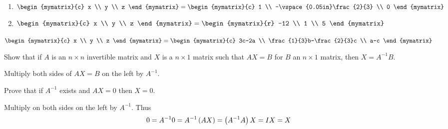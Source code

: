 \begin{enumialphparenastyle}
\begin{ex}
\begin{sol}
\begin{enumerate}
\item $\begin{mymatrix}{c}
x \\
y \\
z
\end{mymatrix} =\begin{mymatrix}{c}
1 \\
-\vspace{0.05in}\frac{2}{3} \\
0
\end{mymatrix}$
\item $\begin{mymatrix}{c}
x \\
y \\
z
\end{mymatrix} = \begin{mymatrix}{r}
-12 \\
1 \\
5
\end{mymatrix}$
\end{enumerate}

$\begin{mymatrix}{c}
x \\
y \\
z
\end{mymatrix} = 
\begin{mymatrix}{c}
3c-2a \\
\frac{1}{3}b-\frac{2}{3}c \\
a-c
\end{mymatrix}$
\end{sol}
\end{ex}

\begin{ex}Show that if $A$ is an $n\times n$ invertible matrix and $X$
is a $n\times 1$ matrix such that $AX=B$ for $B$ an 
$n\times 1$ matrix, then $X=A^{-1}B$. 
\begin{sol}
Multiply both sides of $AX=B$ on the left by $A^{-1}$.
\end{sol}
\end{ex}

\begin{ex}Prove that if $A^{-1}$ exists and $AX=0$ then $X=0$. 
\begin{sol}
Multiply on both sides on the left by $A^{-1}$. Thus
\[
0=A^{-1}0=A^{-1}\left(AX\right) =\left(
A^{-1}A\right) X=IX = X
\]
\end{sol}
\end{ex}


\end{enumialphparenastyle}

